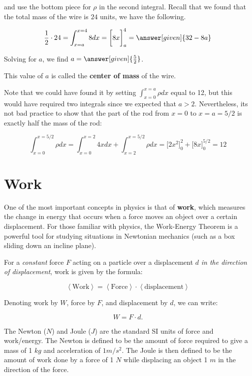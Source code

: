 \documentclass{ximera}
\begin{document}
\begin{example}
\begin{explanation}
and use the bottom piece for $\rho$ in the second integral.  Recall that we found that the total mass of the wire is $24$ units, we have the following.
 
 
\[
\frac{1}{2} \cdot 24 = \int_{x=a}^{x=4} 8 dx = \bigg[8x\bigg]_a^4 = \answer[given]{32-8a} \\
\]  

Solving for $a$, we find $a = \answer[given]{\frac{5}{2}}$.
  \begin{remark}
  This value of $a$ is called the \textbf{center of mass} of the wire.  
  
Note that we could have found it by setting $\int_{x=0}^{x=a} \rho dx$ equal to 12, but this would have required two integrals since we expected that $a>2$.  Nevertheless, its not bad practice to show that the part of the rod from $x=0$ to $x=a=5/2$ is exactly half the mass of the rod:
  
  \[
  \int_{x=0}^{x=5/2} \rho dx =   \int_{x=0}^{x=2} 4x dx +  \int_{x=2}^{x=5/2} \rho dx =\bigg[2x^2\bigg]_0^2+\bigg[8x\bigg]_0^{5/2} = 12
  \]

  \end{remark}
   \end{explanation}

\end{example}


\section{Work}
One of the most important concepts in physics is that of \textbf{work}, which measures the change in energy that occurs when a force moves an object over a certain displacement.  For those familiar with physics, the Work-Energy Theorem is a powerful tool for studying situations in Newtonian mechanics (such as a box sliding down an incline plane). 

For a \emph{constant} force $F$ acting on a particle over a displacement $d$ \emph{in the direction of displacement}, work is given by the formula:

\[ \left<\textrm{Work} \right>=  \left<\textrm{Force} \right> \cdot \left<\textrm{displacement} \right> \]

Denoting work by $W$, force by $F$, and displacement by $d$, we can write:

\[ W = F \cdot d. \]

\begin{fact}
The Newton ($N$) and Joule ($J$) are the standard SI units of force and work/energy.  The Newton is defined to be the amount of force required to give a mass of 1 $kg$ and acceleration of $1m/s^2$.  The Joule is then defined to be the amount of work done by a force of 1 $N$ while displacing  an object 1 $m$ in the direction of the force.
\end{fact}
\end{document}
